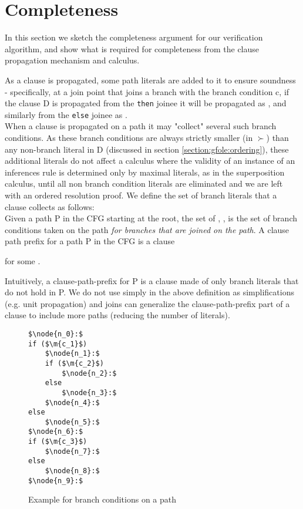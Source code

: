 \newpage

\section{Completeness}
In this section we sketch the completeness argument for our verification algorithm, and show what is required for completeness from the clause propagation mechanism and calculus.

As a clause is propagated, some path literals are added to it to ensure soundness - specifically, 
at a join point that joins a branch with the branch condition c, if the clause D is propagated from the \lstinline|then| joinee it will be propagated as , and similarly from the \lstinline|else| joinee as .\\
When a clause is propagated on a path it may "collect" several such branch conditions. As these branch conditions are always strictly smaller (in $\succ$) than any non-branch literal in D (discussed in section \ref{section:gfole:ordering}), these additional literals do not affect a calculus where the validity of an instance of an inferences rule is determined only by maximal literals, as in the superposition calculus, until all non branch condition literals are eliminated and we are left with an ordered resolution proof.
We define the set of branch literals that a clause collects as follows:\\
Given a path P in the CFG starting at the root, the set of , , 
is the set of branch conditions taken on the path \emph{for branches that are joined on the path}. 
A clause path prefix for a path P in the CFG is a clause

\bigskip

\noindent{} for some .

\bigskip

Intuitively, a clause-path-prefix for P is a clause made of only branch literals that do not hold in P.  
We do not use simply  in the above definition as simplifications (e.g. unit propagation) and joins can generalize the clause-path-prefix part of a clause to include more paths (reducing the number of literals). 

\begin{figure}
\begin{lstlisting}
$\node{n_0}:$
if ($\m{c_1}$)
	$\node{n_1}:$	
	if ($\m{c_2}$)
		$\node{n_2}:$
	else
		$\node{n_3}:$
	$\node{n_4}:$
else	
	$\node{n_5}:$
$\node{n_6}:$
if ($\m{c_3}$)
	$\node{n_7}:$
else
	$\node{n_8}:$
$\node{n_9}:$
\end{lstlisting}
\caption{Example for branch conditions on a path\\
}
\label{snippet4.1.4.4}
\end{figure}

